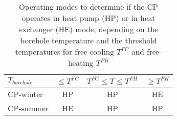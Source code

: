 \begin{table}[h!]
	\centering
	\caption{Operating modes to determine if the CP operates in heat pump (HP) or in heat exchanger (HE) mode, depending on the borehole temperature and the threshold temperatures for free-cooling $T^{FC}$ and free-heating $T^{FH}$}\vspace{2mm}
	\label{tab:CP_tt} 
	\begin{tabular}{lccc} \toprule
		$T_{borehole}$ & $\leq T^{FC}$ & $T^{FC} \leq T \leq T^{FH}$ & $\geq T^{FH}$ \\ \midrule
		CP-winter      & HP                             & HP                                                           & HE                             \\
		CP-summer      & HE                             & HP                                                           & HP                          \\ \bottomrule  
	\end{tabular}
\end{table}